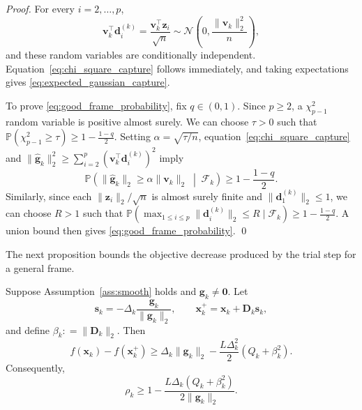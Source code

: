 \documentclass[smallextended]{svjour3}
\newcommand{\bx}{\bm{x}}
\newcommand{\bd}{\bm{d}}
\newcommand{\bg}{\bm{g}}
\newcommand{\bz}{\bm{z}}
\newcommand{\bs}{\bm{s}}
\providecommand{\coloneqq}{\mathrel{\mathop:}=}
\begin{document}
\begin{proof}
For every $i=2,\ldots,p$,
\[
\bm v_k^\top\bd_i^{(k)} = \frac{\bm v_k^\top\bz_i}{\sqrt n} \sim \mathcal N \left( 0, \frac{\|\bm v_k\|_2^2}{n} \right),
\]
and these random variables are conditionally independent. Equation~\eqref{eq:chi_square_capture} follows immediately, and taking expectations gives \eqref{eq:expected_gaussian_capture}.

To prove \eqref{eq:good_frame_probability}, fix $q\in(0,1)$. Since $p\ge 2$, a $\chi^2_{p-1}$ random variable is positive almost surely. We can choose $\tau>0$ such that $\mathbb P(\chi^2_{p-1}\ge\tau) \ge 1 - \frac{1-q}{2}$. Setting $\alpha=\sqrt{\tau/n}$, equation~\eqref{eq:chi_square_capture} and $\|\hat{\bg}_k\|_2^2 \ge \sum_{i=2}^p (\bm v_k^\top\bd_i^{(k)})^2$ imply
\[
\mathbb P\left( \|\hat{\bg}_k\|_2 \ge \alpha\|\bm v_k\|_2 \;\middle|\; \mathcal F_k \right) \ge 1 - \frac{1-q}{2}.
\]
Similarly, since each $\|\bz_i\|_2/\sqrt n$ is almost surely finite and $\|\bd_1^{(k)}\|_2 \le 1$, we can choose $R>1$ such that $\mathbb P(\max_{1\le i\le p}\|\bd_i^{(k)}\|_2 \le R \mid \mathcal F_k) \ge 1 - \frac{1-q}{2}$. A union bound then gives \eqref{eq:good_frame_probability}.
\qed
\end{proof}

The next proposition bounds the objective decrease produced by the trial step for a general frame.

\begin{proposition}
\label{prop:general_descent}
\label{prop:descent}
Suppose Assumption~\ref{ass:smooth} holds and $\bg_k\ne\bm0$. Let
\[
\bs_k = -\Delta_k \frac{\bg_k}{\|\bg_k\|_2}, \qquad \bx_k^+ = \bx_k+\bm D_k\bs_k,
\]
and define $\beta_k \coloneqq \|\bm D_k\|_2$. Then
\begin{equation}
\label{eq:general_decrease}
f(\bx_k)-f(\bx_k^+) \ge \Delta_k\|\bg_k\|_2 - \frac{L\Delta_k^2}{2} (Q_k+\beta_k^2).
\end{equation}
Consequently,
\begin{equation}
\label{eq:general_ratio}
\rho_k \ge 1 - \frac{L\Delta_k(Q_k+\beta_k^2)}{2\|\bg_k\|_2}.
\end{equation}
\end{proposition}
\end{document}

